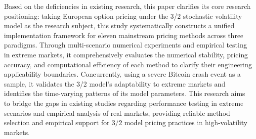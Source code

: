 Based on the deficiencies in existing research, this paper clarifies its core research positioning: taking European option pricing under the 3/2 stochastic volatility model as the research subject, this study systematically constructs a unified implementation framework for eleven mainstream pricing methods across three paradigms. Through multi-scenario numerical experiments and empirical testing in extreme markets, it comprehensively evaluates the numerical stability, pricing accuracy, and computational efficiency of each method to clarify their engineering applicability boundaries. Concurrently, using a severe Bitcoin crash event as a sample, it validates the 3/2 model's adaptability to extreme markets and identifies the time-varying patterns of its model parameters. This research aims to bridge the gaps in existing studies regarding performance testing in extreme scenarios and empirical analysis of real markets, providing reliable method selection and empirical support for 3/2 model pricing practices in high-volatility markets.